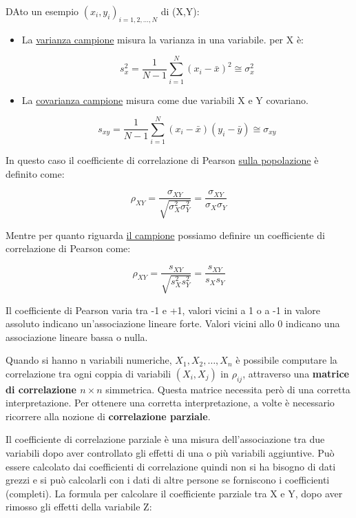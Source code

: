 \documentclass[a4paper]{extarticle}
\begin{document}
DAto un esempio $(x_i,y_i)_{i=1,2,\dots,N}$ di (X,Y):

\begin{itemize}

\item La \underline{varianza campione} misura la varianza in una variabile. per X è:

\begin{equation*}
s_x^2 = \dfrac{1}{N-1}\sum\limits_{i=1}^N (x_i- \bar x)^2 \cong \sigma_x^2
\end{equation*}

\item La \underline{covarianza campione} misura come due variabili X e Y covariano.

\begin{equation*}
s_{xy} = \dfrac{1}{N-1}\sum\limits_{i=1}^N (x_i- \bar x)(y_i - \bar y) \cong \sigma_{xy}
\end{equation*}

\end{itemize}

In questo caso il coefficiente di correlazione di Pearson \underline{sulla popolazione} è definito come:

\begin{equation*}
\rho_{XY} = \dfrac{\sigma_{XY}}{\sqrt{\sigma_X^2 \sigma_Y^2}} = \dfrac{\sigma_{XY}}{\sigma_X\sigma_Y}
\end{equation*}

Mentre per quanto riguarda \underline{il campione} possiamo definire un coefficiente di correlazione di Pearson come:

\begin{equation*}
\rho_{XY} = \dfrac{s_{XY}}{\sqrt{s_X^2 s_Y^2}} = \dfrac{s_{XY}}{s_X s_Y}
\end{equation*}

Il coefficiente di Pearson varia tra -1 e +1, valori vicini a 1 o a -1 in valore assoluto indicano un'associazione lineare forte. Valori vicini allo 0 indicano una associazione lineare bassa o nulla.

Quando si hanno n variabili numeriche, $X_1,X_2,\dots,X_n$ è possibile computare  la correlazione tra ogni coppia di variabili $(X_i,X_j)$ in $\rho_{ij}$, attraverso una \textbf{matrice di correlazione $n\times n$} simmetrica. Questa matrice necessita però di una corretta interpretazione. Per  ottenere una corretta interpretazione, a volte è necessario ricorrere alla nozione di \textbf{correlazione parziale}.

Il coefficiente di correlazione parziale è una misura dell'associazione tra due variabili dopo aver controllato gli effetti di una o più variabili aggiuntive. Può essere calcolato dai coefficienti di correlazione quindi non si ha bisogno di dati grezzi e si può calcolarli con i dati di altre persone se forniscono i coefficienti (completi). La formula per calcolare il coefficiente parziale tra X e Y, dopo aver rimosso gli effetti della variabile Z:
\end{document}
